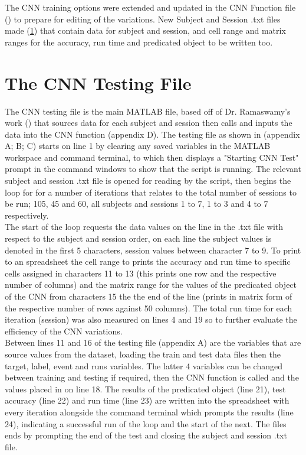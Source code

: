 The CNN training options were extended and updated in the CNN Function file (\cite{options}) to prepare for editing of the variations. New Subject and Session .txt files made (\cref{The CNN Testing File Section}) that contain data for subject and session, and cell range and matrix ranges for the accuracy, run time and predicated object to be written too. 

\section{The CNN Testing File}
\label{The CNN Testing File Section}

The CNN testing file is the main MATLAB file, based off of Dr. Ramaswamy's work (\cite{PalaniPaper}) that sources data for each subject and session then calls and inputs the data into the CNN function (appendix D). The testing file as shown in (appendix A; B; C) starts on line 1 by clearing any saved variables in the MATLAB workspace and command terminal, to which then displays a "Starting CNN Test" prompt in the command windows to show that the script is running. The relevant subject and session .txt file is opened for reading by the script, then begins the loop for for a number of iterations that relates to the total number of sessions to be run; 105, 45 and 60, all subjects and sessions 1 to 7, 1 to 3 and 4 to 7 respectively. \\ 

The start of the loop requests the data values on the line in the .txt file with respect to the subject and session order, on each line the subject values is denoted in the first 5 characters, session values between character 7 to 9. To print to an spreadsheet the cell range to prints the accuracy and run time to specific cells assigned in characters 11 to 13 (this prints one row and the respective number of columns) and the matrix range for the values of the predicated object of the CNN from characters 15 the the end of the line (prints in matrix form of the respective number of rows against 50 columns). The total run time for each iteration (session) was also measured on lines 4 and 19 so to further evaluate the efficiency of the CNN variations. \\

Between lines 11 and 16 of the testing file (appendix A) are the variables that are source values from the dataset, loading the train and test data files then the target, label, event and runs variables. The latter 4 variables can be changed between training and testing if required, then the CNN function is called and the values placed in on line 18. The results of the predicated object (line 21), test accuracy (line 22) and run time (line 23) are written into the spreadsheet with every iteration alongside the command terminal which prompts the results (line 24), indicating a successful run of the loop and the start of the next. The files ends by prompting the end of the test and closing the subject and session .txt file. 

